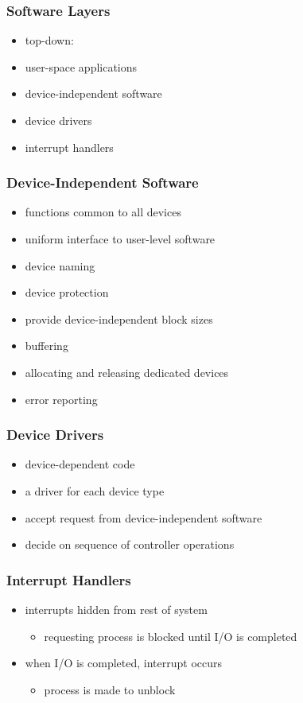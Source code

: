 \documentclass[dvipsnames]{beamer}
\begin{document}
\begin{frame}
  \frametitle{Software Layers}

  \begin{itemize}
    \item top-down:

    \medskip
    \item user-space applications
    \item device-independent software
    \item device drivers
    \item interrupt handlers
  \end{itemize}
\end{frame}

\begin{frame}
  \frametitle{Device-Independent Software}

  \begin{itemize}
    \item functions common to all devices
    \item uniform interface to user-level software
    \item device naming
    \item device protection
    \item provide device-independent block sizes
    \item buffering
    \item allocating and releasing dedicated devices
    \item error reporting
  \end{itemize}
\end{frame}

\begin{frame}
  \frametitle{Device Drivers}

  \begin{itemize}
    \item device-dependent code
    \item a driver for each device type

    \medskip
    \item accept request from device-independent software
    \item decide on sequence of controller operations
  \end{itemize}
\end{frame}

\begin{frame}
  \frametitle{Interrupt Handlers}

  \begin{itemize}
    \item interrupts hidden from rest of system
    \begin{itemize}
      \item requesting process is blocked until I/O is completed
    \end{itemize}

    \item when I/O is completed, interrupt occurs
    \begin{itemize}
      \item process is made to unblock
    \end{itemize}
  \end{itemize}
\end{frame}
\end{document}
